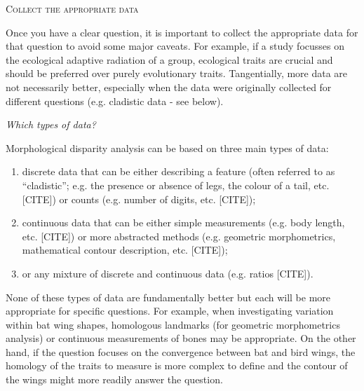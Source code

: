 \documentclass[12pt,letterpaper]{article}
\renewcommand{\section}[1]{%
\bigskip
\begin{center}
\begin{Large}
\normalfont\scshape #1
\medskip
\end{Large}
\end{center}}
\renewcommand{\subsection}[1]{%
\bigskip
\begin{center}
\begin{large}
\normalfont\itshape #1
\end{large}
\end{center}}
\begin{document}
\section{Collect the appropriate data}
Once you have a clear question, it is important to collect the appropriate data for that question to avoid some major caveats.
For example, if a study focusses on the ecological adaptive radiation of a group, ecological traits are crucial and should be preferred over purely evolutionary traits.
Tangentially, more data are not necessarily better, especially when the data were originally collected for different questions (e.g. cladistic data - see below).

\subsection{Which types of data?} %
Morphological disparity analysis can be based on three main types of data:
\begin{enumerate}
    \item discrete data that can be either describing a feature (often referred to as ``cladistic''; e.g. the presence or absence of legs, the colour of a tail, etc. [CITE]) or counts (e.g. number of digits, etc. [CITE]);
    \item continuous data that can be either simple measurements (e.g. body length, etc. [CITE]) or more abstracted methods (e.g. geometric morphometrics, mathematical contour description, etc. [CITE]);
    \item or any mixture of discrete and continuous data (e.g. ratios [CITE]).
\end{enumerate}
None of these types of data are fundamentally better but each will be more appropriate for specific questions.
For example, when investigating variation within bat wing shapes, homologous landmarks (for geometric morphometrics analysis) or continuous measurements of bones may be appropriate.
On the other hand, if the question focuses on the convergence between bat and bird wings, the homology of the traits to measure is more complex to define and the contour of the wings might more readily answer the question. %
\end{document}
